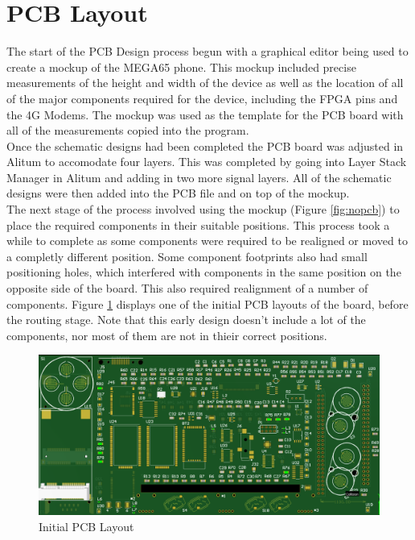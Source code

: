 
\section{PCB Layout}
\label{chap6sec5}

	The start of the PCB Design process begun with a graphical editor being used to create a mockup of the MEGA65 phone. This mockup included precise measurements of the height and width of the device as well as the location of all of the major components required for the device, including the FPGA pins and the 4G Modems. The mockup was used as the template for the PCB board with all of the measurements copied into the program. \\
	Once the schematic designs had been completed the PCB board was adjusted in Alitum to accomodate four layers. This was completed by going into Layer Stack Manager in Alitum and adding in two more signal layers. All of the schematic designs were then added into the PCB file and on top of the mockup. \\
The next stage of the process involved using the mockup (Figure \ref{fig:nopcb}) to place the required components in their suitable positions. This process took a while to complete as some components were required to be realigned or moved to a completly different position. Some component footprints also had small positioning holes, which interfered with components in the same position on the opposite side of the board. This also required realignment of a number of components. Figure \ref{fig:Initial_PCB} displays one of the initial PCB layouts of the board, before the routing stage. Note that this early design doesn't include a lot of the components, nor most of them are not in thieir correct positions.\\

\begin{figure}
	\includegraphics[width=\linewidth]{Figures/PCB.png}
	\caption{Initial PCB Layout}
	\label{fig:Initial_PCB}
\end{figure}

